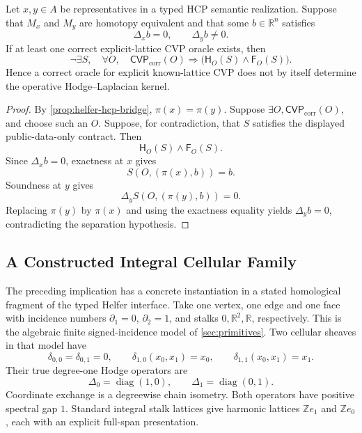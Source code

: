 \begin{proposition}\label{prop:cvp-insufficient}
  Let \(x,y\in A\) be representatives in a typed HCP semantic realization.
  Suppose that \(M_x\) and \(M_y\) are homotopy equivalent and that some
  \(b\in\mathbb R^n\) satisfies
  \[
    \Delta_xb=0,
    \qquad
    \Delta_yb\ne0.
  \]
  If at least one correct explicit-lattice CVP oracle exists, then
  \[
    \neg\exists S,\quad
    \forall O,\quad
    \mathsf{CVP}_{\mathrm{corr}}(O)\Rightarrow
    \bigl(
      \mathsf H_O(S)
      \wedge
      \mathsf F_O(S)
    \bigr).
  \]
  Hence a correct oracle for explicit known-lattice CVP does not by itself
  determine the operative Hodge--Laplacian kernel.
\end{proposition}

\begin{proof}
  By \cref{prop:helfer-hcp-bridge},
  \(\pi(x)=\pi(y)\). Suppose
  \(\exists O,\mathsf{CVP}_{\mathrm{corr}}(O)\), and choose such an \(O\).
  Suppose, for contradiction, that \(S\) satisfies the displayed
  public-data-only contract. Then
  \[
    \mathsf H_O(S)\wedge\mathsf F_O(S).
  \]
  Since \(\Delta_xb=0\), exactness at \(x\) gives
  \[
    S(O,(\pi(x),b))=b.
  \]
  Soundness at \(y\) gives
  \[
    \Delta_yS(O,(\pi(y),b))=0.
  \]
  Replacing \(\pi(y)\) by \(\pi(x)\) and using the exactness equality yields
  \(\Delta_yb=0\), contradicting the separation hypothesis.
\end{proof}

\subsection{A Constructed Integral Cellular Family}\label{sec:axis-family}

The preceding implication has a concrete instantiation in a stated
homological fragment of the typed Helfer interface. Take one vertex, one edge
and one face with incidence numbers \(\partial_1=0\), \(\partial_2=1\),
and stalks \(0,\mathbb R^2,\mathbb R\), respectively. This is the algebraic
finite signed-incidence model of \cref{sec:primitives}. Two cellular
sheaves in that model have
\[
  \delta_{0,0}=\delta_{0,1}=0,
  \qquad
  \delta_{1,0}(x_0,x_1)=x_0,
  \qquad
  \delta_{1,1}(x_0,x_1)=x_1.
\]
Their true degree-one Hodge operators are
\[
  \Delta_0=\operatorname{diag}(1,0),
  \qquad
  \Delta_1=\operatorname{diag}(0,1).
\]
Coordinate exchange is a degreewise chain isometry. Both operators have
positive spectral gap \(1\). Standard integral stalk lattices give harmonic
lattices \(\mathbb Z e_1\) and \(\mathbb Z e_0\), each with an explicit
full-span presentation.

